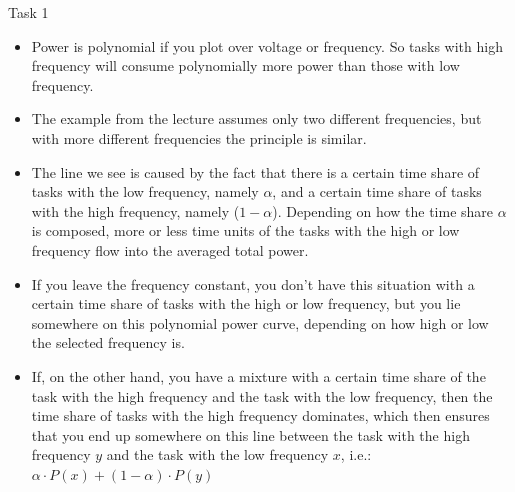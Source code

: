 \begin{frame}[allowframebreaks]{Task 1}{}
{\begin{Sidenote}
      \begin{itemize}
        \item Power is \alert{polynomial} if you plot over voltage or frequency. So tasks with high frequency will consume polynomially more power than those with low frequency.
        \item The example from the lecture assumes only \alert{two} different frequencies, but with more different frequencies the principle is similar.
        \item The line we see is caused by the fact that there is a certain time share of tasks with the low frequency, namely $\alpha$, and a certain time share of tasks with the high frequency, namely ($1-\alpha$). Depending on how the time share $\alpha$ is composed, more or less time units of the tasks with the high or low frequency flow into the averaged total power.
      \end{itemize}
    \end{Sidenote}
    \framebreak
    \begin{Sidenote}
      \begin{itemize}
        \item If you leave the frequency constant, you don't have this situation with a certain time share of tasks with the high or low frequency, but you lie somewhere on this polynomial power curve, depending on how high or low the selected frequency is.
        \item If, on the other hand, you have a mixture with a certain time share of the task with the high frequency and the task with the low frequency, then the time share of tasks with the high frequency dominates, which then ensures that you end up somewhere on this line between the task with the high frequency $y$ and the task with the low frequency $x$, i.e.: $\alpha \cdot P(x) + (1-\alpha) \cdot P(y)$
      \end{itemize}
    \end{Sidenote}
  }\fi
\end{frame}
